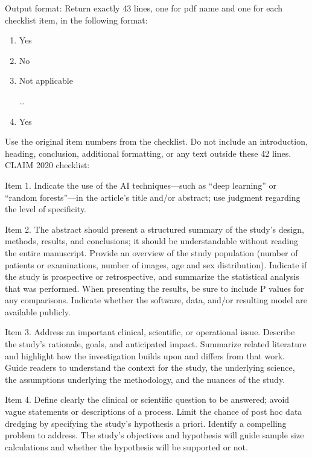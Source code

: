 Output format: Return exactly 43 lines, one for pdf name and one for each checklist item, in the following format:

\begin{enumerate}
    \item Yes
    \item No
    \item Not applicable
    \setcounter{enumi}{41}
    
    \dots
    
    \item Yes
\end{enumerate}

Use the original item numbers from the checklist. Do not include an introduction, heading, conclusion, additional formatting, or any text outside these 42 lines.\\


\noindent
CLAIM 2020 checklist:

Item 1. Indicate the use of the AI techniques—such as “deep learning” or “random forests”—in the article’s title and/or abstract; use judgment regarding the level of specificity.

Item 2. The abstract should present a structured summary of the study’s design, methods, results, and conclusions; it should be understandable without reading the entire manuscript. Provide an overview of the study population (number of patients or examinations, number of images, age and sex distribution). Indicate if the study is prospective or retrospective, and summarize the statistical analysis that was performed. When presenting the results, be sure to include P values for any comparisons. Indicate whether the software, data, and/or resulting model are available publicly.

Item 3. Address an important clinical, scientific, or operational issue. Describe the study’s rationale, goals, and anticipated impact. Summarize related literature and highlight how the investigation builds upon and differs from that work. Guide readers to understand the context for the study, the underlying science, the assumptions underlying the methodology, and the nuances of the study.

Item 4. Define clearly the clinical or scientific question to be answered; avoid vague statements or descriptions of a process. Limit the chance of post hoc data dredging by specifying the study’s hypothesis a priori. Identify a compelling problem to address. The study’s objectives and hypothesis will guide sample size calculations and whether the hypothesis will be supported or not.

